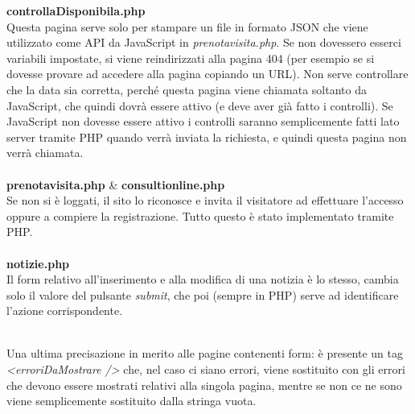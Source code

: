 \textbf{controllaDisponibila.php} \\
Questa pagina serve solo per stampare un file in formato JSON che viene utilizzato come API da JavaScript in \textit{prenotavisita.php}. Se non dovessero esserci variabili impostate, si viene reindirizzati alla pagina 404 (per esempio se si dovesse provare ad accedere alla pagina copiando un URL).
Non serve controllare che la data sia corretta, perché questa pagina viene chiamata soltanto da JavaScript, che quindi dovrà essere attivo (e deve aver già fatto i controlli).
Se JavaScript non dovesse essere attivo i controlli saranno semplicemente fatti lato server tramite PHP quando verrà inviata la richiesta, e quindi questa pagina non verrà chiamata. \\ \\

\textbf{prenotavisita.php} \& \textbf{consultionline.php} \\
Se non si è loggati, il sito lo riconosce e invita il visitatore ad effettuare l'accesso oppure a compiere la registrazione. Tutto questo è stato implementato tramite PHP. \\ \\

\textbf{notizie.php} \\
Il form relativo all'inserimento e alla modifica di una notizia è lo stesso, cambia solo il valore del pulsante \textit{submit}, che poi (sempre in PHP) serve ad identificare l'azione corrispondente. \\ \\

\bigskip

Una ultima precisazione in merito alle pagine contenenti form: è presente un tag \textit{<erroriDaMostrare />} che, nel caso ci siano errori, viene sostituito con gli errori che devono essere mostrati  relativi alla singola pagina, mentre se non ce ne sono viene semplicemente sostituito dalla stringa vuota.







